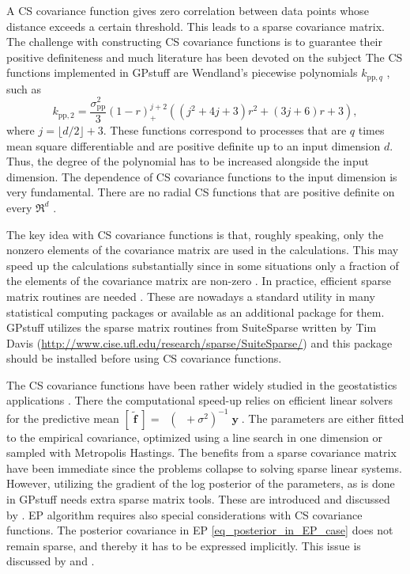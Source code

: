 \documentclass[twoside,11pt]{article}
\DeclareMathOperator{\Kff}{\mathbf{K}_{f,f}}
\DeclareMathOperator{\Kaf}{\mathbf{K}_{\tilde{f},f}}
\DeclareMathOperator{\f}{\mathbf{f}}
\DeclareMathOperator{\y}{\mathbf{y}}
\newcommand{\pkg}[1]{{\fontseries{b}\selectfont #1}}
\begin{document}

A CS covariance function gives zero correlation between data points
whose distance exceeds a certain threshold. This leads to a sparse
covariance matrix. The challenge with constructing CS covariance
functions is to guarantee their positive definiteness and much
literature has been devoted on the subject \citep[see
e.g.][]{Sanso+Schuh:1987,Wu:1995,Wendland:1995,Gaspari+Cohn:1999,Gneiting:1999,Gneiting:2002,Buhmann:2000}
The CS functions implemented in \pkg{GPstuff} are Wendland's piecewise
polynomials $k_{\text{pp},q}$ \citep{Wendland:2005}, such as
% 
\begin{equation}\label{ppcs2}
k_{\text{pp},2} = 
\frac{\sigma_{\text{pp}}^2}{3} (1 - r)_+^{j+2} \left( (j^2 + 4j
   +3) r^2  +   (3j + 6)r + 3\right) , 
\end{equation}
%
where $j = \lfloor d/2 \rfloor + 3$. These functions correspond to
processes that are $q$ times mean square differentiable and are
positive definite up to an input dimension $d$. Thus, the degree of
the polynomial has to be increased alongside the input dimension. The
dependence of CS covariance functions to the input dimension is very
fundamental. There are no radial CS functions that are positive
definite on every $\Re^d$ \citep[see e.g.][theorem
9.2]{Wendland:1995}.

The key idea with CS covariance functions is that, roughly speaking,
only the nonzero elements of the covariance matrix are used in the
calculations. This may speed up the calculations substantially since
in some situations only a fraction of the elements of the covariance
matrix are non-zero \citep[see
e.g.][]{Vanhatalo+Vehtari:2008,Rue+Martino+Chopin:2009}. In practice,
efficient sparse matrix routines are needed \citep{Davis:2006}. These
are nowadays a standard utility in many statistical computing packages
or available as an additional package for them.  \pkg{GPstuff}
utilizes the sparse matrix routines from \pkg{SuiteSparse} written by
Tim Davis (\url{http://www.cise.ufl.edu/research/sparse/SuiteSparse/})
and this package should be installed before using CS covariance
functions.

The CS covariance functions have been rather widely studied in the
geostatistics applications \citep[see
e.g.][]{Gneiting:2002,Furrer+Genton+Nychka:2006,Moreaux:2008}. There
the computational speed-up relies on efficient linear solvers for the
predictive mean $[\tilde{\f}] = \Kaf (\Kff +\sigma^2)^{-1}\y$. The
parameters are either fitted to the empirical covariance, optimized
using a line search in one dimension
\citep{Kaufman+Schervish+Nychka:2008} or sampled with Metropolis
Hastings. The benefits from a sparse covariance matrix have been
immediate since the problems collapse to solving sparse linear
systems. However, utilizing the gradient of the log posterior of the
parameters, as is done in \pkg{GPstuff} needs extra sparse matrix
tools. These are introduced and discussed by
\citet{Vanhatalo+Vehtari:2008}.  EP algorithm requires also special
considerations with CS covariance functions. The posterior covariance
in EP \eqref{eq_posterior_in_EP_case} does not remain sparse, and
thereby it has to be expressed implicitly. This issue is discussed by
\citet{Vanhatalo+Vehtari:2010} and
\citet{Vanhatalo+Pietilainen+Vehtari:2010}.
\end{document}
